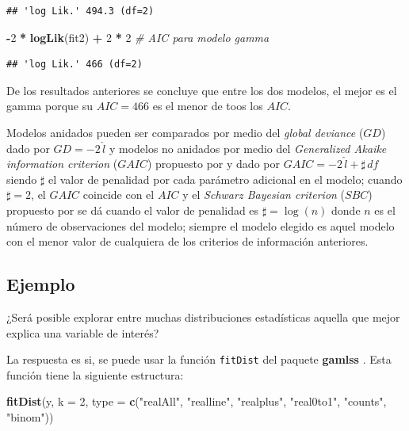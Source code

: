 \documentclass[10pt,]{krantz}
\makeatletter
\newenvironment{Shaded}{\begin{snugshade}}{\end{snugshade}}
\newcommand{\KeywordTok}[1]{\textcolor[rgb]{0.13,0.29,0.53}{\textbf{#1}}}
\newcommand{\DataTypeTok}[1]{\textcolor[rgb]{0.13,0.29,0.53}{#1}}
\newcommand{\DecValTok}[1]{\textcolor[rgb]{0.00,0.00,0.81}{#1}}
\newcommand{\StringTok}[1]{\textcolor[rgb]{0.31,0.60,0.02}{#1}}
\newcommand{\CommentTok}[1]{\textcolor[rgb]{0.56,0.35,0.01}{\textit{#1}}}
\newcommand{\OperatorTok}[1]{\textcolor[rgb]{0.81,0.36,0.00}{\textbf{#1}}}
\newcommand{\NormalTok}[1]{#1}
\newenvironment{kframe}{%
\medskip{}
\setlength{\fboxsep}{.8em}
 \def\at@end@of@kframe{}%
 \ifinner\ifhmode%
  \def\at@end@of@kframe{\end{minipage}}%
  \begin{minipage}{\columnwidth}%
 \fi\fi%
 \def\FrameCommand##1{\hskip\@totalleftmargin \hskip-\fboxsep
 \colorbox{shadecolor}{##1}\hskip-\fboxsep
     \hskip-\linewidth \hskip-\@totalleftmargin \hskip\columnwidth}%
 \MakeFramed {\advance\hsize-\width
   \@totalleftmargin\z@ \linewidth\hsize
   \@setminipage}}%
 {\par\unskip\endMakeFramed%
 \at@end@of@kframe}
\renewenvironment{Shaded}{\begin{kframe}}{\end{kframe}}
\let\BeginKnitrBlock\begin \let\EndKnitrBlock\end
\makeatother
\begin{document}
\begin{verbatim}
## 'log Lik.' 494.3 (df=2)
\end{verbatim}

\begin{Shaded}
\begin{Highlighting}[]
\OperatorTok{-}\DecValTok{2} \OperatorTok{*}\StringTok{ }\KeywordTok{logLik}\NormalTok{(fit2) }\OperatorTok{+}\StringTok{ }\DecValTok{2} \OperatorTok{*}\StringTok{ }\DecValTok{2}  \CommentTok{# AIC para modelo gamma}
\end{Highlighting}
\end{Shaded}

\begin{verbatim}
## 'log Lik.' 466 (df=2)
\end{verbatim}

De los resultados anteriores se concluye que entre los dos modelos, el
mejor es el gamma porque su \(AIC=466\) es el menor de toos los \(AIC\).

\BeginKnitrBlock{rmdnote}
Modelos anidados pueden ser comparados por medio del \emph{global
deviance} (\(GD\)) dado por \(GD=-2 \, \hat{l}\) y modelos no anidados
por medio del \emph{Generalized Akaike information criterion} (\(GAIC\))
propuesto por \citet{Akaike83} y dado por
\(GAIC=-2 \, \hat{l} + \sharp \, df\) siendo \(\sharp\) el valor de
penalidad por cada parámetro adicional en el modelo; cuando
\(\sharp = 2\), el \(GAIC\) coincide con el \(AIC\) y el \emph{Schwarz
Bayesian criterion} (\(SBC\)) propuesto por \citet{Schwarz} se dá cuando
el valor de penalidad es \(\sharp = \log(n)\) donde \(n\) es el número
de observaciones del modelo; siempre el modelo elegido es aquel modelo
con el menor valor de cualquiera de los criterios de información
anteriores.
\EndKnitrBlock{rmdnote}

\subsection*{Ejemplo}\label{ejemplo-52}


¿Será posible explorar entre muchas distribuciones estadísticas aquella
que mejor explica una variable de interés?

La respuesta es si, se puede usar la función \texttt{fitDist} del
paquete \textbf{gamlss} . Esta función tiene la siguiente
estructura:

\begin{Shaded}
\begin{Highlighting}[]
\KeywordTok{fitDist}\NormalTok{(y, }\DataTypeTok{k =} \DecValTok{2}\NormalTok{, }
      \DataTypeTok{type =} \KeywordTok{c}\NormalTok{(}\StringTok{"realAll"}\NormalTok{, }\StringTok{"realline"}\NormalTok{, }\StringTok{"realplus"}\NormalTok{,}
               \StringTok{"real0to1"}\NormalTok{, }\StringTok{"counts"}\NormalTok{, }\StringTok{"binom"}\NormalTok{))}
\end{Highlighting}
\end{Shaded}
\end{document}
